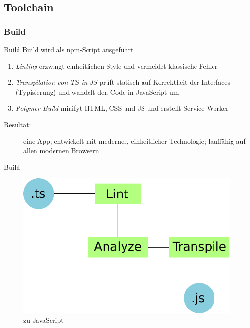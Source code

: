 \documentclass{beamer}
\newcommand{\inlinegfx}[1]{\raisebox{-.2\baselineskip}{\texttt{[image: \#1]}}}
\begin{document}
\subsection{Toolchain}
\subsubsection{Build}
\begin{frame}{Build}
	Build wird als npm-Script ausgeführt
	\begin{enumerate}
		\item \emph{Linting} erzwingt einheitlichen Style und vermeidet klassische Fehler
			\pause
		\item \emph{Transpilation von \acl*{TS} in \acl*{JS}} prüft statisch auf Korrektheit der Interfaces (Typisierung) und wandelt den Code in JavaScript um
			\pause
		\item \emph{Polymer Build} minifyt \acs{HTML}, \acs{CSS} und \ac{JS} und erstellt Service Worker
	\end{enumerate}
			\pause
	\begin{description}
		\item[Resultat:] eine App; entwickelt mit moderner, einheitlicher Technologie; lauffähig auf allen modernen Browsern
	\end{description}
\end{frame}

\begin{frame}{Build}
	\begin{figure}
		\centering
		\includegraphics[width=\textwidth]{gfx/TypeScript2JavaScript}
		\caption{\inlinegfx{gfx/TypeScript-logo} zu JavaScript}
		\label{fig:TS2JS}
	\end{figure}
\end{frame}
\end{document}
